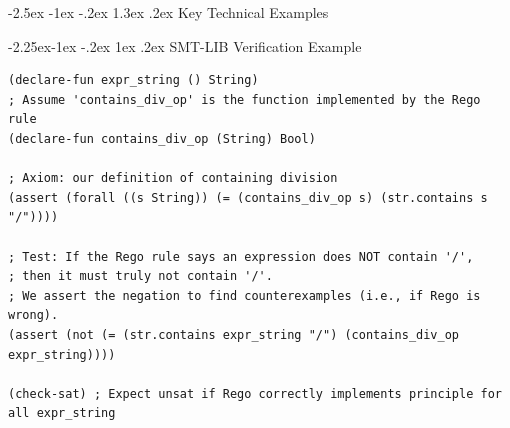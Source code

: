 \documentclass[manuscript,screen,review,anonymous,9pt]{acmart}
\makeatletter
\renewcommand\section{\@startsection{section}{1}{\z@}%
  {-2.5ex \@plus -1ex \@minus -.2ex}%
  {1.3ex \@plus.2ex}%
  {\normalfont\Large\bfseries}}
\renewcommand\subsection{\@startsection{subsection}{2}{\z@}%
  {-2.25ex\@plus -1ex \@minus -.2ex}%
  {1ex \@plus .2ex}%
  {\normalfont\large\bfseries}}
\makeatother
\begin{document}
\section{Key Technical Examples}
\label{app:key_examples}

\subsection{SMT-LIB Verification Example}
\begin{lstlisting}[language=Rego, caption=SMT-LIB example for CP-SAFETY-001 verification. This code checks if a Rego rule correctly identifies expressions containing a division operator., label=lst:smtlib_example, basicstyle=\ttfamily\scriptsize]
(declare-fun expr_string () String)
; Assume 'contains_div_op' is the function implemented by the Rego rule
(declare-fun contains_div_op (String) Bool)

; Axiom: our definition of containing division
(assert (forall ((s String)) (= (contains_div_op s) (str.contains s "/"))))

; Test: If the Rego rule says an expression does NOT contain '/',
; then it must truly not contain '/'.
; We assert the negation to find counterexamples (i.e., if Rego is wrong).
(assert (not (= (str.contains expr_string "/") (contains_div_op expr_string))))

(check-sat) ; Expect unsat if Rego correctly implements principle for all expr_string
\end{lstlisting}
\end{document}
